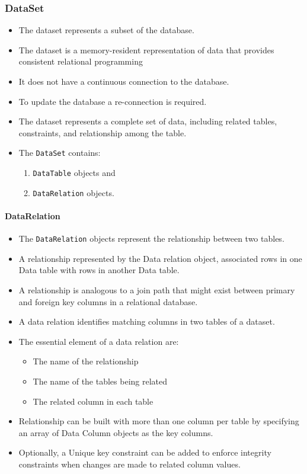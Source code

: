 

\subsubsection{DataSet}
\begin{itemize}
	\item The dataset represents a subset of the database. 
	\item The dataset is a memory-resident representation of data that provides consistent relational programming
	\item It does not have a continuous connection to the database. 
	\item To update the database a re-connection is required. 
	\item The dataset represents a complete set of data, including related tables, constraints, and relationship
	among the table.
	\item The \texttt{DataSet} contains:
	\begin{enumerate}
		\item \texttt{DataTable} objects and 
		\item \texttt{DataRelation} objects. 
	\end{enumerate}

\end{itemize}

\paragraph*{DataRelation}
\begin{itemize}
	\item The \texttt{DataRelation} objects	represent the relationship between two tables.
	\item A relationship represented by the Data relation object, associated rows in one Data table with rows in another Data table.
	\item A relationship is analogous to a join path that might exist between primary and foreign key columns in a relational database.
	\item A data relation identifies matching columns in two tables of a dataset.
	\item The essential element of a data relation are:
		\begin{itemize}
			\item The name of the relationship
			\item The name of the tables being related
			\item The related column in each table
		\end{itemize}
	\item Relationship can be built with more than one column per table by specifying an array of Data Column objects as the key columns.
	\item Optionally, a Unique key constraint can be added to enforce integrity constraints when changes are made to related column values.
\end{itemize}


